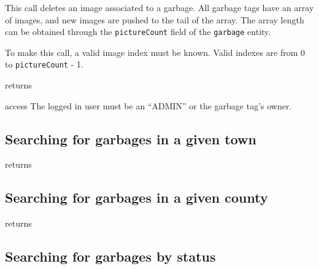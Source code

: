 This call deletes an image associated to a garbage. All garbage tags have an
array of images, and new images are pushed to the tail of the array. The array
length can be obtained through the \texttt{pictureCount} field of the
\texttt{garbage} entity. 

To make this call, a valid image index must be known. Valid indexes are from 0
to \texttt{pictureCount} - 1.

\begin{apidata}{returns}
  \begin{datalist}
  \end{datalist}
\end{apidata}
\begin{apidata}{access}
The logged in user must be an ``ADMIN'' or the garbage tag's owner.
\end{apidata}


\subsection{Searching for garbages in a given town}

\begin{apidata}{returns}
  \begin{datalist}
  \end{datalist}
\end{apidata}


\subsection{Searching for garbages in a given county}

\begin{apidata}{returns}
  \begin{datalist}
  \end{datalist}
\end{apidata}


\subsection{Searching for garbages by status}

